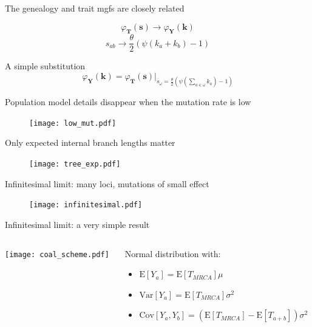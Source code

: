 \documentclass{beamer}
\newcommand{\T}{\frac{\theta}{2}}
\newcommand{\E}{\mathrm{E}}
\newcommand{\Var}{\mathrm{Var}}
\newcommand{\Cov}{\mathrm{Cov}}
\begin{document}
\begin{frame}{The genealogy and trait mgfs are closely related}

  {\Huge
  \begin{equation*}
     \varphi_{\mathbf{T}}(\mathbf{s}) \longrightarrow \varphi_{\mathbf{Y}}(\mathbf{k})
  \end{equation*}
  \begin{equation*}
    s_{ab} \longrightarrow \T \left(\psi\left( k_a + k_b\right) - 1 \right)
  \end{equation*}
  }
  \begin{block}{A simple substitution}
    \Large
    \begin{equation*}
      \varphi_{\mathbf{Y}}(\mathbf{k}) = \varphi_{\mathbf{T}}(\mathbf{s})\Bigr|_{s_{\omega}=\frac{\theta}{2} \left( \psi\left(\sum_{a \in \omega}k_{a}\right) -1 \right)}
    \end{equation*}
  \end{block}
\end{frame}

\begin{frame}{Population model details disappear when the mutation rate is low}
  \begin{figure}
    \texttt{[image: low\_mut.pdf]}        
  \end{figure}
\end{frame}

\begin{frame}{Only expected internal branch lengths matter}
  \begin{figure}
    \texttt{[image: tree\_exp.pdf]}        
  \end{figure}
\end{frame}

\begin{frame}{Infinitesimal limit: many loci, mutations of small effect}
  \begin{figure}
    \texttt{[image: infinitesimal.pdf]}    
  \end{figure}
\end{frame}

\begin{frame}{Infinitesimal limit: a very simple result}
  \begin{columns}
    \begin{column}{0.5\textwidth}
      \begin{center}
        \texttt{[image: coal\_scheme.pdf]}
      \end{center}
    \end{column}
    \begin{column}{0.5\textwidth}
      Normal distribution with:
      \begin{itemize}
      \item $\E[Y_a] = \E[T_{MRCA}] \mu$
      \item $\Var[Y_a] = \E[T_{MRCA}]\sigma^2$
      \item $\Cov[Y_a,Y_b] = (\E[T_{MRCA}] - \E[T_{a+b}]) \sigma^2$
      \end{itemize}
    \end{column}
  \end{columns}
\end{frame}
\end{document}

